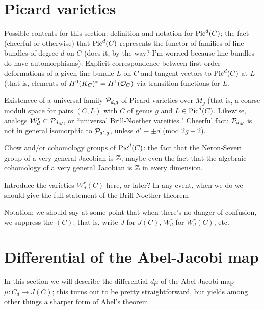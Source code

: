 \section{Picard varieties}

Possible contents for this section: definition and notation for $\Pic^d(C)$; the fact (cheerful or otherwise) that $\Pic^d(C)$ represents the functor of families of line bundles of degree $d$ on $C$ (does it, by the way? I'm worried because line bundles do have automorphisms). Explicit correspondence between first order deformations of a given line bundle $L$ on $C$ and tangent vectors to $\Pic^d(C)$ at $L$ (that is, elements of $H^0(K_C)^* = H^1(\cO_C)$ via transition functions for $L$.

\def\cW{{\mathcal W}}

Existencee of a universal family $\cP_{d,g}$ of Picard varieties over $M_g$ (that is, a coarse moduli space for pairs $(C,L)$ with $C$ of genus $g$ and $L \in \Pic^d(C)$. Likewise, analogs $\cW^r_d \subset \cP_{d,g}$, or ``universal Brill-Noether vareities."
Cheerful fact: $\cP_{d,g}$ is not in general isomorphic to $\cP_{d',g}$, unless $d' \equiv
 \pm d$ (mod $2g-2$). 
 
 Chow and/or cohomology groups of $\Pic^d(C)$: the fact that the Neron-Severi group of a very general Jacobian is $\ZZ$; maybe even the fact that the algebraic cohomology of a very general Jacobian is $\ZZ$ in every dimension.
 
 Introduce the varieties $W^r_d(C)$ here, or later? In any event, when we do we should give the full statement of the Brill-Noether theorem
 
 Notation: we should say at some point that when there's no danger of confusion, we suppress the $(C)$: that is, write $J$ for $J(C)$, $W^r_d$ for $W^r_d(C)$, etc.

\section{Differential of the Abel-Jacobi map}

In this section we will describe the differential $d\mu$ of the Abel-Jacobi map $\mu : C_d \to J(C)$; this turns out to be pretty straightforward, but yields among other things a sharper form of Abel's theorem.

